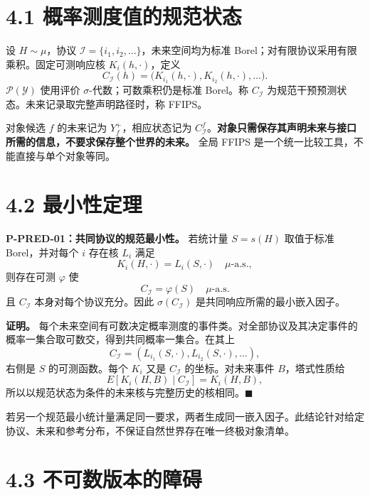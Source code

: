 \documentclass[
  11pt,
  oneside]{book}
\begin{document}
\section{4.1 概率测度值的规范状态}\label{ux6982ux7387ux6d4bux5ea6ux503cux7684ux89c4ux8303ux72b6ux6001}

设 \(H\sim\mu\)，协议 \(\mathcal I=\{i_1,i_2,\ldots\}\)，未来空间均为标准 Borel；对有限协议采用有限乘积。固定可测响应核 \(K_i(h,\cdot)\)，定义 \[C_{\mathcal I}(h)=\bigl(K_{i_1}(h,\cdot),K_{i_2}(h,\cdot),\ldots\bigr).\] \(\mathcal P(\mathcal Y)\) 使用评价 \(\sigma\)-代数；可数乘积仍是标准 Borel。称 \(C_{\mathcal I}\) 为规范干预预测状态。未来记录取完整声明路径时，称 FFIPS。

对象候选 \(f\) 的未来记为 \(Y_f^+\)，相应状态记为 \(C^{f}_{\mathcal I}\)。\textbf{对象只需保存其声明未来与接口所需的信息，不要求保存整个世界的未来。} 全局 FFIPS 是一个统一比较工具，不能直接与单个对象等同。

\section{4.2 最小性定理}\label{ux6700ux5c0fux6027ux5b9aux7406}

\hypertarget{p-pred-01}{}\label{p-pred-01}

\textbf{P-PRED-01：共同协议的规范最小性。} 若统计量 \(S=s(H)\) 取值于标准 Borel，并对每个 \(i\) 存在核 \(L_i\) 满足 \[K_i(H,\cdot)=L_i(S,\cdot)\quad\mu\text{-a.s.},\] 则存在可测 \(\varphi\) 使 \[C_{\mathcal I}=\varphi(S)\quad\mu\text{-a.s.}\] 且 \(C_{\mathcal I}\) 本身对每个协议充分。因此 \(\sigma(C_{\mathcal I})\) 是共同响应所需的最小嵌入因子。

\textbf{证明。} 每个未来空间有可数决定概率测度的事件类。对全部协议及其决定事件的概率一集合取可数交，得到共同概率一集合。在其上 \[C_{\mathcal I}=(L_{i_1}(S,\cdot),L_{i_2}(S,\cdot),\ldots),\] 右侧是 \(S\) 的可测函数。每个 \(K_i\) 又是 \(C_{\mathcal I}\) 的坐标。对未来事件 \(B\)，塔式性质给 \[E[K_i(H,B)\mid C_{\mathcal I}]=K_i(H,B),\] 所以以规范状态为条件的未来核与完整历史的核相同。\(\blacksquare\)

若另一个规范最小统计量满足同一要求，两者生成同一嵌入因子。此结论针对给定协议、未来和参考分布，不保证自然世界存在唯一终极对象清单。

\section{4.3 不可数版本的障碍}\label{ux4e0dux53efux6570ux7248ux672cux7684ux969cux788d}
\end{document}
